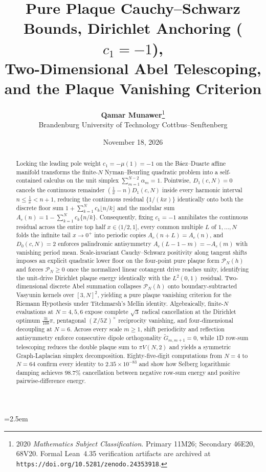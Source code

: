\documentclass[10pt,a4paper]{article}
\title{\textbf{Pure Plaque Cauchy--Schwarz Bounds, Dirichlet Anchoring ($c_1 = -1$),\\
Two-Dimensional Abel Telescoping, and the Plaque Vanishing Criterion}}
\author{\textbf{Qamar Munawer}\thanks{2020 \emph{Mathematics Subject Classification}. Primary 11M26; Secondary 46E20, 68V20. Formal Lean~4.35 verification artifacts are archived at \texttt{https://doi.org/10.5281/zenodo.24353918}.}\\[0.2em]
\small Brandenburg University of Technology Cottbus--Senftenberg}
\date{November 18, 2026}
\theoremstyle{definition}
\begin{document}
\linespread{1.11}\selectfont
\emergencystretch=2.5em

\maketitle

\begin{abstract}
Locking the leading pole weight $c_1 = -\mu(1) = -1$ on the B\'aez--Duarte affine manifold transforms the finite-$N$ Nyman--Beurling quadratic problem into a self-contained calculus on the unit simplex $\sum_{m=1}^{N-2}\alpha_m = 1$. Pointwise, $D_1(c,N) = 0$ cancels the continuous remainder $(\tfrac{1}{x} - n)D_1(c,N)$ inside every harmonic interval $n \le \tfrac{1}{x} < n+1$, reducing the continuous residual $\{1/(kx)\}$ identically onto both the discrete floor sum $1 + \sum_{k=1}^N c_k \lfloor n/k \rfloor$ and the modular sum $A_c(n) = 1 - \sum_{k=1}^N c_k \{n/k\}$. Consequently, fixing $c_1 = -1$ annihilates the continuous residual across the entire top half $x \in (1/2, 1]$, every common multiple $L$ of $1,\dots,N$ folds the infinite tail $x \to 0^+$ into periodic copies $A_c(n+L) = A_c(n)$, and $D_0(c,N) = 2$ enforces palindromic antisymmetry $A_c(L - 1 - m) = -A_c(m)$ with vanishing period mean. Scale-invariant Cauchy--Schwarz positivity along tangent shifts imposes an explicit quadratic lower floor on the four-point pure plaque form $\mathcal{P}_N(h)$ and forces $\mathcal{P}_N \ge 0$ once the normalized linear cotangent drive reaches unity, identifying the unit-drive Dirichlet plaque energy identically with the $L^2(0,1)$ residual. Two-dimensional discrete Abel summation collapses $\mathcal{P}_N(h)$ onto boundary-subtracted Vasyunin kernels over $[3, N]^2$, yielding a pure plaque vanishing criterion for the Riemann Hypothesis under Titchmarsh's Mellin identity. Algebraically, finite-$N$ evaluations at $N=4, 5, 6$ expose complete $\sqrt{3}$ radical cancellation at the Dirichlet optimum $\tfrac{31}{108}\pi$, pentagonal $(\mathbb{Z}/5\mathbb{Z})^\times$ reciprocity vanishing, and four-dimensional decoupling at $N=6$. Across every scale $m \ge 1$, shift periodicity and reflection antisymmetry enforce consecutive dipole orthogonality $\widetilde{G}_{m, m+1} = 0$, while 1D row-sum telescoping reduces the double plaque sum to $\pi V(N,2)$ and yields a symmetric Graph-Laplacian simplex decomposition. Eighty-five-digit computations from $N=4$ to $N=64$ confirm every identity to $2.35 \times 10^{-83}$ and show how Selberg logarithmic damping achieves $98.7\%$ cancellation between negative row-sum energy and positive pairwise-difference energy.
\end{abstract}
\end{document}
